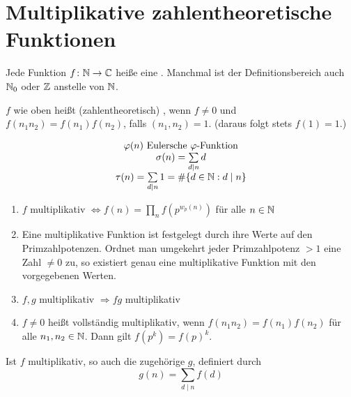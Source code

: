 \section{Multiplikative zahlentheoretische Funktionen}
\label{sec:para8}
	Jede Funktion $f \colon \mathbb{N} \rightarrow \mathbb{C}$ heiße eine . Manchmal ist der Definitionsbereich auch $\mathbb{N}_0$ oder $\mathbb{Z}$ anstelle von $\mathbb{N}$.

\begin{defn}	\label{def_8.1}
	$f$ wie oben heißt (zahlentheoretisch) , wenn $f \neq 0$ und $f(n_1n_2) = f(n_1)f(n_2)$, falls $(n_1,n_2) = 1$. (daraus folgt stets $f(1) = 1$.)
\end{defn}

	\[ \begin{array}{c}
	\varphi(n) \text{ Eulersche } \varphi\text{-Funktion} \\ 
	\sigma(n) = \sum\limits_{d \mid n} d \\ 
	\tau(n) = \sum\limits_{d \mid n} 1 = \#\{d \in \mathbb{N} : d \mid n\}
	\end{array} \]

	\begin{enumerate}[1)]
		\item $f$ multiplikativ $\Leftrightarrow f(n) = \prod\limits_{n} f(p^{w_p(n)})$ für alle $n \in \mathbb{N}$
		\item Eine multiplikative Funktion ist festgelegt durch ihre Werte auf den Primzahlpotenzen. Ordnet man umgekehrt jeder Primzahlpotenz $> 1$ eine Zahl $\neq 0$ zu, so existiert genau eine multiplikative Funktion mit den vorgegebenen Werten.
		\item $f, g$ multiplikativ $\Rightarrow fg$ multiplikativ
		\item $f \neq 0$ heißt vollständig multiplikativ, wenn $f(n_1n_2) = f(n_1)f(n_2)$ für alle $n_1, n_2 \in \mathbb{N}$. Dann gilt $f(p^k) = f(p)^k$.
	\end{enumerate}
	
\begin{falko} \label{F8.1}
	Ist $f$ multiplikativ, so auch die zugehörige  $g$, definiert durch 
	\[ g(n) = \sum\limits_{d \mid n} f(d) \]
\end{falko}

